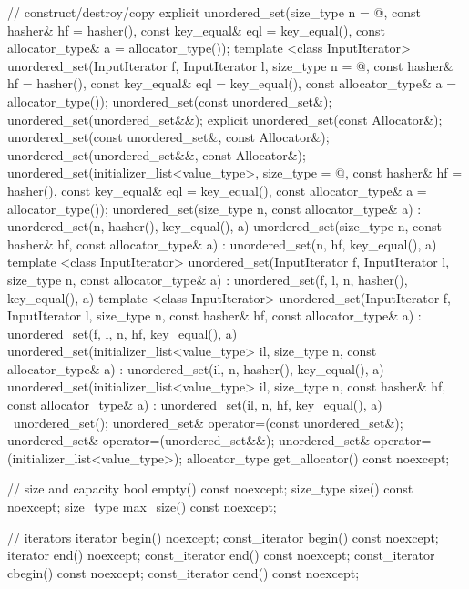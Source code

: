 \begin{codeblock}
{{    // construct/destroy/copy
    explicit unordered_set(size_type n = @\seebelow@,
                           const hasher& hf = hasher(),
                           const key_equal& eql = key_equal(),
                           const allocator_type& a = allocator_type());
    template <class InputIterator>
      unordered_set(InputIterator f, InputIterator l,
                    size_type n = @\seebelow@,
                    const hasher& hf = hasher(),
                    const key_equal& eql = key_equal(),
                    const allocator_type& a = allocator_type());
    unordered_set(const unordered_set&);
    unordered_set(unordered_set&&);
    explicit unordered_set(const Allocator&);
    unordered_set(const unordered_set&, const Allocator&);
    unordered_set(unordered_set&&, const Allocator&);
    unordered_set(initializer_list<value_type>,
      size_type = @\seebelow@,
      const hasher& hf = hasher(),
      const key_equal& eql = key_equal(),
      const allocator_type& a = allocator_type());
    unordered_set(size_type n, const allocator_type& a)
      : unordered_set(n, hasher(), key_equal(), a) { }
    unordered_set(size_type n, const hasher& hf, const allocator_type& a)
      : unordered_set(n, hf, key_equal(), a) { }
    template <class InputIterator>
      unordered_set(InputIterator f, InputIterator l, size_type n, const allocator_type& a)
      : unordered_set(f, l, n, hasher(), key_equal(), a) { }
    template <class InputIterator>
      unordered_set(InputIterator f, InputIterator l, size_type n, const hasher& hf,
      const allocator_type& a)
      : unordered_set(f, l, n, hf, key_equal(), a) { }
    unordered_set(initializer_list<value_type> il, size_type n, const allocator_type& a)
      : unordered_set(il, n, hasher(), key_equal(), a) { }
    unordered_set(initializer_list<value_type> il, size_type n, const hasher& hf,
    const allocator_type& a)
      : unordered_set(il, n, hf, key_equal(), a) { }
    ~unordered_set();
    unordered_set& operator=(const unordered_set&);
    unordered_set& operator=(unordered_set&&);
    unordered_set& operator=(initializer_list<value_type>);
    allocator_type get_allocator() const noexcept;

    // size and capacity
    bool empty() const noexcept;
    size_type size() const noexcept;
    size_type max_size() const noexcept;

    // iterators
    iterator       begin() noexcept;
    const_iterator begin() const noexcept;
    iterator       end() noexcept;
    const_iterator end() const noexcept;
    const_iterator cbegin() const noexcept;
    const_iterator cend() const noexcept;

}}
\end{codeblock}
